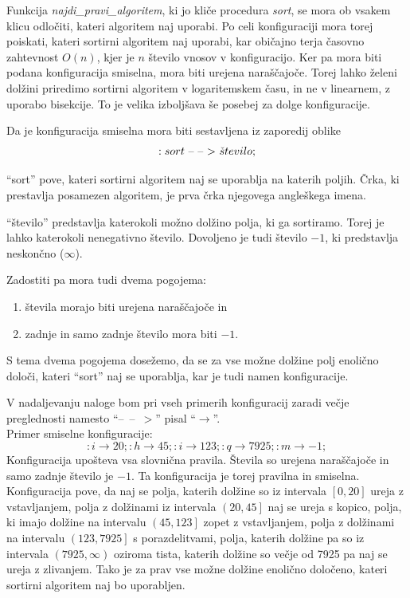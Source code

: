 \documentclass[a4paper,oneside,12pt]{article}
\newcommand{\konfarrow}{\mbox{--}~\mbox{--}~\mbox{\ensuremath{>}}}
\newcommand{\lra}{\ensuremath{\longrightarrow}}
\begin{document}
Funkcija \emph{najdi\_pravi\_algoritem}, ki jo kliče procedura \emph{sort}, se mora ob vsakem klicu odločiti, kateri
algoritem naj uporabi. Po celi konfiguraciji mora torej poiskati, kateri sortirni algoritem
naj uporabi, kar običajno terja časovno zahtevnost
$O(n)$, kjer je $n$ število vnosov v konfiguracijo. Ker pa mora biti podana konfiguracija
smiselna, mora biti urejena naraščajoče. Torej lahko želeni dolžini priredimo sortirni
algoritem v logaritemskem času, in ne v linearnem, z uporabo bisekcije. To je velika
izboljšava še posebej za dolge konfiguracije.

Da je konfiguracija smiselna mora biti sestavljena iz zaporedij oblike
\[ :sort\ \konfarrow\ \check{s}tevilo; \]

``sort'' pove, kateri sortirni algoritem naj se uporablja na katerih poljih. Črka, ki
prestavlja posamezen algoritem, je prva črka njegovega angleškega imena.

``število'' predstavlja katerokoli možno dolžino polja, ki ga sortiramo. Torej je lahko
katerokoli nenegativno število. Dovoljeno je tudi število $-1$, ki predstavlja neskončno
($\infty$).

Zadostiti pa mora tudi dvema pogojema:
\begin{enumerate}
  \item števila morajo biti urejena naraščajoče in
  \item zadnje in samo zadnje število mora biti $-1$.
\end{enumerate}
S tema dvema pogojema dosežemo, da se za vse možne dolžine polj enolično
določi, kateri ``sort'' naj se uporablja, kar je tudi namen konfiguracije.

V nadaljevanju naloge bom pri vseh primerih konfiguracij zaradi večje preglednosti 
namesto ``\konfarrow'' pisal ``\lra''. \\

Primer smiselne konfiguracije:
\[ :i \lra 20;:h \lra 45;:i \lra 123;:q \lra 7925;:m \lra -1; \]
Konfiguracija upošteva vsa slovnična pravila.
Števila so urejena naraščajoče in samo zadnje število je $-1$. Ta konfiguracija je torej
pravilna in smiselna. Konfiguracija pove, da naj se polja, katerih dolžine so iz intervala $\left[0,
20\right]$ ureja z vstavljanjem, polja z dolžinami iz intervala $\left(20, 45\right]$ naj
se ureja s kopico, polja, ki imajo dolžine na intervalu $\left(45, 123\right]$ zopet z vstavljanjem,
polja z dolžinami na intervalu $\left(123, 7925\right]$ s porazdelitvami, polja, katerih dolžine pa so iz
intervala $\left(7925, \infty\right)$ oziroma tista, katerih dolžine so večje od 7925
pa naj se ureja z zlivanjem. Tako je za prav vse možne dolžine enolično določeno, kateri
sortirni algoritem naj bo uporabljen.
\end{document}
